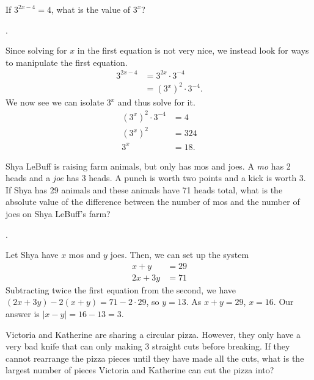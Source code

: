 \documentclass[11pt]{article}
\begin{document}
\begin{problem}If $3^{2x-4} = 4$, what is the value of $3^{x}$?
\end{problem}
\begin{answer}
.
\end{answer}
\begin{solution}
Since solving for $x$ in the first equation is not very nice, we instead look for ways to manipulate the first equation.
\begin{align*}
3^{2x-4} &= 3^{2x} \cdot 3^{-4} \\
&= (3^x)^2 \cdot 3^{-4}.
\end{align*}
We now see we can isolate  $3^{x}$ and thus solve for it.
\begin{align*}
(3^x)^2 \cdot 3^{-4} &= 4 \\
(3^x)^2 &= 324 \\
3^x &= \boxed{18}.
\end{align*}
\end{solution}



\begin{problem}  Shya LeBuff is raising farm animals, but only has mos and joes. A \emph{mo} has 2 heads and a \emph{joe} has 3 heads. A punch is worth two points and a kick is worth 3. If Shya has 29 animals and these animals have 71 heads total, what is the absolute value of the difference between the number of mos and the number of joes on Shya LeBuff's farm?
\end{problem}

.
\begin{solution}
Let Shya have $x$ mos and $y$ joes. Then, we can set up the system
\begin{align*}
x + y &= 29 \\
2x + 3y &= 71
\end{align*}
Subtracting twice the first equation from the second, we have $(2x + 3y) - 2(x + y) = 71 - 2 \cdot 29$, so $y = 13$. As $x + y = 29$, $x = 16$. Our answer is $\left| x - y \right| = 16 - 13 = \boxed{3}$.
\end{solution}

\begin{problem} Victoria and Katherine are sharing a circular pizza. However, they only have a very bad knife that can only making 3 straight cuts before breaking. If they cannot rearrange the pizza pieces until they have made all the cuts, what is the largest number of pieces Victoria and Katherine can cut the pizza into?
\end{problem}
\end{document}
